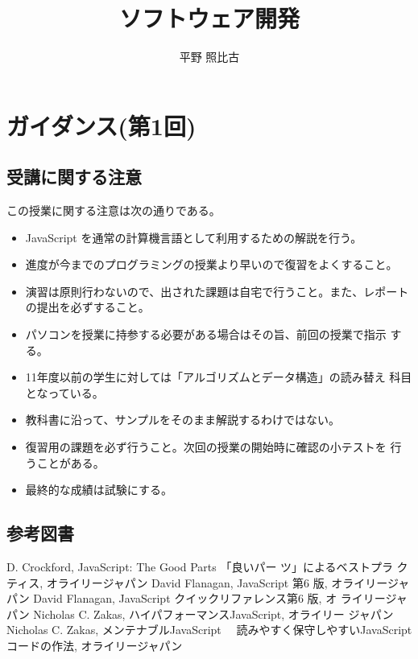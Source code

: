 \documentclass[a4j]{jarticle}
\title{ソフトウェア開発}
\author{平野 照比古}
\date{}
\begin{document}
\maketitle
\section{ガイダンス(第1回)}
\subsection{受講に関する注意}
この授業に関する注意は次の通りである。
\begin{itemize}
 \item JavaScript を通常の計算機言語として利用するための解説を行う。
 \item 進度が今までのプログラミングの授業より早いので復習をよくすること。
 \item 演習は原則行わないので、出された課題は自宅で行うこと。また、レポート
       の提出を必ずすること。
 \item パソコンを授業に持参する必要がある場合はその旨、前回の授業で指示
       する。
 \item 11年度以前の学生に対しては「アルゴリズムとデータ構造」の読み替え
       科目となっている。
 \item 教科書に沿って、サンプルをそのまま解説するわけではない。
  \item 復習用の課題を必ず行うこと。次回の授業の開始時に確認の小テストを
       行うことがある。
\item 最終的な成績は試験にする。
\end{itemize}
\subsection{参考図書}
\begin{thebibliography}{9}
 D. Crockford, JavaScript: The Good Parts 「良いパー
	 ツ」によるベストプラ クティス, オライリージャパン
 David Flanagan, JavaScript 第6 版, オライリージャパン
 David Flanagan, JavaScript クイックリファレンス第6 版, オ
	 ライリージャパン
 Nicholas C. Zakas, ハイパフォーマンスJavaScript, オライリー
	 ジャパン
 Nicholas C. Zakas, メンテナブルJavaScript 　読みやすく保守しやすいJavaScript 
コードの作法, オライリージャパン
\end{thebibliography}
\end{document}
